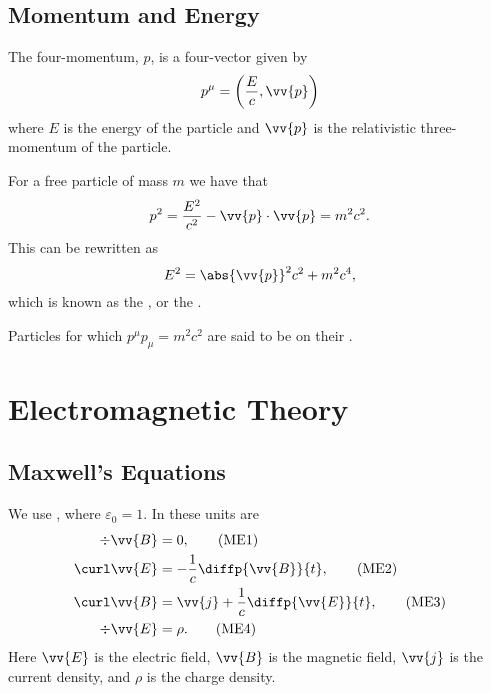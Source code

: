 \documentclass[fleqn]{NotesClass}
\begin{document}
\begin{appendices}
        \subsection{Momentum and Energy}
        The four-momentum, \(p\), is a four-vector given by
        \begin{equation}
            p^\mu = \left( \frac{E}{c}, \vv{p} \right)
        \end{equation}
        where \(E\) is the energy of the particle and \(\vv{p}\) is the relativistic three-momentum of the particle.
        
        For a free particle of mass \(m\) we have that
        \begin{equation}
            p^2 = \frac{E^2}{c^2} - \vv{p} \cdot \vv{p} = m^2c^2.
        \end{equation}
        This can be rewritten as
        \begin{equation}
            E^2 = \abs{\vv{p}}^2c^2 + m^2c^4,
        \end{equation}
        which is known as the , or the .
        
        Particles for which \(p^\mu p_\mu = m^2c^2\) are said to be on their .
        
        \section{Electromagnetic Theory}
        \subsection{Maxwell's Equations}
        We use , where \(\varepsilon_0 = 1\).
        In these units  are
        \begin{align}
            \div \vv{B} &= 0, \tag{ME1}\\
            \curl \vv{E} &= -\frac{1}{c}\diffp{\vv{B}}{t}, \tag{ME2}\\
            \curl \vv{B} &= \vv{j} + \frac{1}{c} \diffp{\vv{E}}{t}, \tag{ME3}\\
            \div \vv{E} &= \rho. \tag{ME4}
        \end{align}
        Here \(\vv{E}\) is the electric field, \(\vv{B}\) is the magnetic field, \(\vv{j}\) is the current density, and \(\rho\) is the charge density.
        

\end{appendices}
\end{document}
